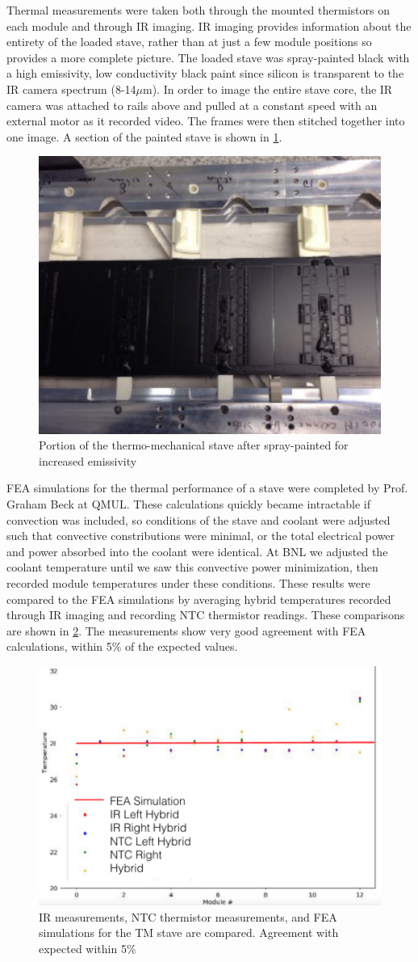Thermal measurements were taken both through the mounted thermistors on each module and through IR imaging. IR imaging provides information about the entirety of the loaded stave, rather than at just a few module positions so provides a more complete picture. The loaded stave was spray-painted black with a high emissivity, low conductivity black paint since silicon is transparent to the IR camera spectrum (8-14$\mu$m). In order to image the entire stave core, the IR camera was attached to rails above and pulled at a constant speed with an external motor as it recorded video. The frames were then stitched together into one image. A section of the painted stave is shown in \ref{fig:paintedstave}.  

\begin{figure}[!h]
        \centering
    \includegraphics[width=.4\textwidth]{Pictures/paintedstave.png}
    \caption{Portion of the thermo-mechanical stave after spray-painted for increased emissivity}
    \label{fig:paintedstave}
\end{figure}

FEA simulations for the thermal performance of a stave were completed by Prof. Graham Beck at QMUL. These calculations quickly became intractable if convection was included, so conditions of the stave and coolant were adjusted such that convective constributions were minimal, or the total electrical power and power absorbed into the coolant were identical. At BNL we adjusted the coolant temperature until we saw this convective power minimization, then recorded module temperatures under these conditions. These results were compared to the FEA simulations by averaging hybrid temperatures recorded through IR imaging and recording NTC thermistor readings. These comparisons are shown in \ref{fig:FEAcompare}. The measurements show very good agreement with FEA calculations, within 5\% of the expected values.

\begin{figure}[!h]
        \centering
    \includegraphics[width=.4\textwidth]{Pictures/FEAcompare.png}
    \caption{IR measurements, NTC thermistor measurements, and FEA simulations for the TM stave are compared. Agreement with expected within 5\%}
    \label{fig:FEAcompare}
\end{figure} 

